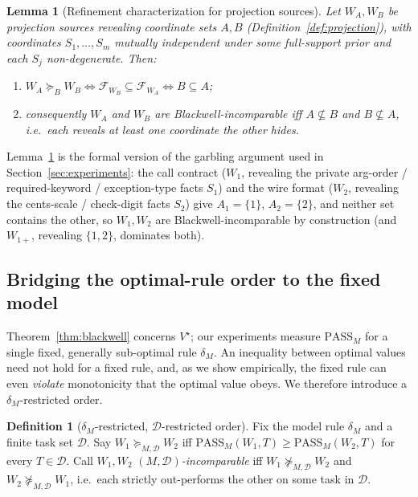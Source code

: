 \documentclass[11pt]{article}
\theoremstyle{plain}
\newtheorem{lemma}{Lemma}
\theoremstyle{definition}
\newtheorem{definition}{Definition}
\theoremstyle{remark}
\newcommand{\PASS}{\mathrm{PASS}}
\newcommand{\Dcal}{\mathcal{D}}
\newcommand{\Fcal}{\mathcal{F}}
\newcommand{\Bord}{\succeq_{B}}
\begin{document}
\begin{lemma}[Refinement characterization for projection sources]
\label{lem:noref}
Let $W_A, W_B$ be projection sources revealing coordinate sets $A,B$
(Definition~\ref{def:projection}), with coordinates $S_1,\dots,S_m$ mutually independent under
some full-support prior and each $S_j$ non-degenerate. Then:
\begin{enumerate}
  \item[\textup{(a)}] $W_A \Bord W_B \iff \Fcal_{W_B} \subseteq \Fcal_{W_A}
    \iff B \subseteq A$;
  \item[\textup{(b)}] consequently $W_A$ and $W_B$ are Blackwell-\emph{incomparable} iff
    $A \not\subseteq B$ and $B \not\subseteq A$, i.e.\ each reveals at least one coordinate the
    other hides.
\end{enumerate}
\end{lemma}

Lemma~\ref{lem:noref} is the formal version of the garbling argument used in
Section~\ref{sec:experiments}: the call contract ($W_1$, revealing the private arg-order /
required-keyword / exception-type facts $S_1$) and the wire format ($W_2$, revealing the
cents-scale / check-digit facts $S_2$) give $A_1=\{1\}$, $A_2=\{2\}$, and neither set contains the
other, so $W_1, W_2$ are Blackwell-incomparable by construction (and $W_{1+}$, revealing
$\{1,2\}$, dominates both).

\subsection{Bridging the optimal-rule order to the fixed model}
\label{subsec:bridge}

Theorem~\ref{thm:blackwell} concerns $V^\star$; our experiments measure $\PASS_M$ for a single
fixed, generally sub-optimal rule $\delta_M$. An inequality between optimal values need not hold
for a fixed rule, and, as we show empirically, the fixed rule can even \emph{violate} monotonicity
that the optimal value obeys. We therefore introduce a $\delta_M$-restricted order.

\begin{definition}[$\delta_M$-restricted, $\Dcal$-restricted order]
\label{def:dmorder}
Fix the model rule $\delta_M$ and a finite task set $\Dcal$. Say $W_1 \succeq_{M,\Dcal} W_2$ iff
$\PASS_M(W_1,T) \ge \PASS_M(W_2,T)$ for every $T \in \Dcal$. Call $W_1, W_2$
\emph{$(M,\Dcal)$-incomparable} iff $W_1 \not\succeq_{M,\Dcal} W_2$ and $W_2 \not\succeq_{M,\Dcal} W_1$, i.e.\
each strictly out-performs the other on some task in $\Dcal$.
\end{definition}
\end{document}
